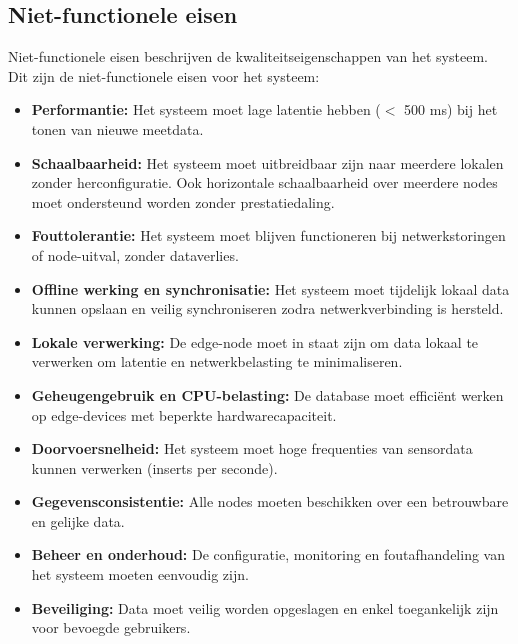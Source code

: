 \subsection{Niet-functionele eisen}

Niet-functionele eisen beschrijven de kwaliteitseigenschappen van het systeem. Dit zijn de niet-functionele eisen voor het systeem:

\begin{itemize}
    \item \textbf{Performantie:} Het systeem moet lage latentie hebben ($<$ 500 ms) bij het tonen van nieuwe meetdata.
    \item \textbf{Schaalbaarheid:} Het systeem moet uitbreidbaar zijn naar meerdere lokalen zonder herconfiguratie. Ook horizontale schaalbaarheid over meerdere nodes moet ondersteund worden zonder prestatiedaling.
    \item \textbf{Fouttolerantie:} Het systeem moet blijven functioneren bij netwerkstoringen of node-uitval, zonder dataverlies.
    \item \textbf{Offline werking en synchronisatie:} Het systeem moet tijdelijk lokaal data kunnen opslaan en veilig synchroniseren zodra netwerkverbinding is hersteld.
    \item \textbf{Lokale verwerking:} De edge-node moet in staat zijn om data lokaal te verwerken om latentie en netwerkbelasting te minimaliseren.
    \item \textbf{Geheugengebruik en CPU-belasting:} De database moet efficiënt werken op edge-devices met beperkte hardwarecapaciteit.
    \item \textbf{Doorvoersnelheid:} Het systeem moet hoge frequenties van sensordata kunnen verwerken (inserts per seconde).
    \item \textbf{Gegevensconsistentie:} Alle nodes moeten beschikken over een betrouwbare en gelijke data.
    \item \textbf{Beheer en onderhoud:} De configuratie, monitoring en foutafhandeling van het systeem moeten eenvoudig zijn.
    \item \textbf{Beveiliging:} Data moet veilig worden opgeslagen en enkel toegankelijk zijn voor bevoegde gebruikers.
\end{itemize}

